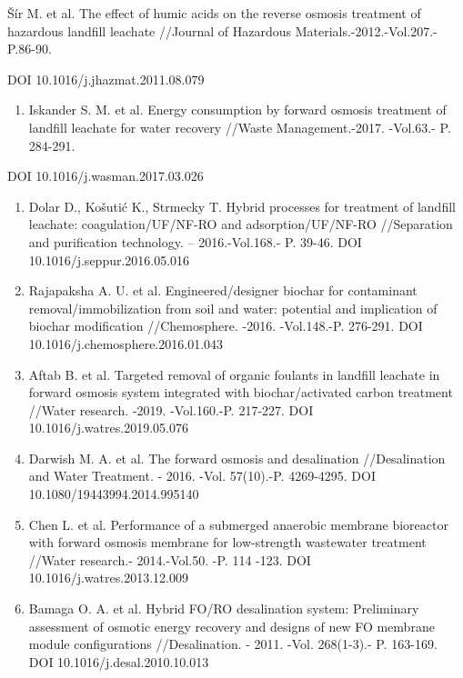 Šír M. et al. The effect of humic acids on the reverse osmosis treatment
of hazardous landfill leachate //Journal of Hazardous
Materials.-2012.-Vol.207.- P.86-90.

DOI 10.1016/j.jhazmat.2011.08.079

\begin{enumerate}
\def\labelenumi{\arabic{enumi}.}
\setcounter{enumi}{8}
\item
  Iskander S. M. et al. Energy consumption by forward osmosis treatment
  of landfill leachate for water recovery //Waste Management.-2017.
  -Vol.63.- P. 284-291.
\end{enumerate}

DOI 10.1016/j.wasman.2017.03.026

\begin{enumerate}
\def\labelenumi{\arabic{enumi}.}
\setcounter{enumi}{9}
\item
  Dolar D., Košutić K., Strmecky T. Hybrid processes for treatment of
  landfill leachate: coagulation/UF/NF-RO and adsorption/UF/NF-RO
  //Separation and purification technology. -- 2016.-Vol.168.- P. 39-46.
  DOI 10.1016/j.seppur.2016.05.016
\item
  Rajapaksha A. U. et al. Engineered/designer biochar for contaminant
  removal/immobilization from soil and water: potential and implication
  of biochar modification //Chemosphere. -2016. -Vol.148.-P. 276-291.
  DOI 10.1016/j.chemosphere.2016.01.043
\item
  Aftab B. et al. Targeted removal of organic foulants in landfill
  leachate in forward osmosis system integrated with biochar/activated
  carbon treatment //Water research. -2019. -Vol.160.-P. 217-227. DOI
  10.1016/j.watres.2019.05.076
\item
  Darwish M. A. et al. The forward osmosis and desalination
  //Desalination and Water Treatment. - 2016. -Vol. 57(10).-P.
  4269-4295. DOI 10.1080/19443994.2014.995140
\item
  Chen L. et al. Performance of a submerged anaerobic membrane
  bioreactor with forward osmosis membrane for low-strength wastewater
  treatment //Water research.- 2014.-Vol.50. -P. 114 -123. DOI
  10.1016/j.watres.2013.12.009
\item
  Bamaga O. A. et al. Hybrid FO/RO desalination system: Preliminary
  assessment of osmotic energy recovery and designs of new FO membrane
  module configurations //Desalination. - 2011. -Vol. 268(1-3).- P.
  163-169. DOI 10.1016/j.desal.2010.10.013
\end{enumerate}

